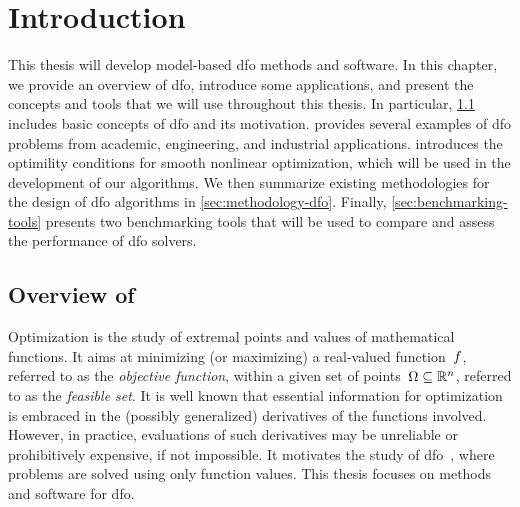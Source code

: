%
%
%
\chapter{Introduction}
\label{ch:introduction}


This thesis will develop model-based \gls{dfo} methods and software.
In this chapter, we provide an overview of \gls{dfo}, introduce some applications, and present the concepts and tools that we will use throughout this thesis.
In particular, \cref{sec:overview} includes basic concepts of \gls{dfo} and its motivation.
 provides several examples of \gls{dfo} problems from academic, engineering, and industrial applications.
 introduces the optimility conditions for smooth nonlinear optimization, which will be used in the development of our algorithms.
We then summarize existing methodologies for the design of \gls{dfo} algorithms in \cref{sec:methodology-dfo}.
Finally, \cref{sec:benchmarking-tools} presents two benchmarking tools that will be used to compare and assess the performance of \gls{dfo} solvers.

\section{Overview of }
\label{sec:overview}

Optimization is the study of extremal points and values of mathematical functions.
It aims at minimizing (or maximizing) a real-valued function~$f$, referred to as the \emph{objective function}, within a given set of points~$\Omega \subseteq \mathbb{R}^n$, referred to as the \emph{feasible set}.
It is well known that essential information for optimization is embraced in the (possibly generalized) derivatives of the functions involved.
However, in practice, evaluations of such derivatives may be unreliable or prohibitively expensive, if not impossible.
It motivates the study of \gls{dfo}~\cite{Conn_Scheinberg_Vicente_2009b,Audet_Hare_2017,Custodio_Scheinberg_Vicente_2017,Larson_Menickelly_Wild_2019}, where problems are solved using only function values.
This thesis focuses on methods and software for \gls{dfo}.

